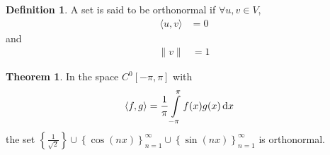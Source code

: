 \documentclass[fleqn, a4paper, 12pt, twoside]{article}
\theoremstyle{definition}
\newtheorem{definition}{Definition}
\theoremstyle{theorem}
\newtheorem{theorem}{Theorem}
\begin{document}
\begin{definition}
	A set is said to be orthonormal if $\forall u,v \in V$,
	\begin{align*}
		\langle u,v \rangle & = 0
	\end{align*}
	and
	\begin{align*}
		\|v\| & = 1
	\end{align*}
\end{definition}

\begin{theorem}
	In the space $C^0[-\pi,\pi]$ with
	\begin{align*}
		\langle f,g \rangle & = \frac{1}{\pi} \int\limits_{-\pi}^{\pi} f(x) g(x) \dif x
	\end{align*}
	the set $\left\{ \frac{1}{\sqrt{2}} \right\} \cup \left\{ \cos(n x) \right\}_{n = 1}^{\infty} \cup \left\{ \sin(n x) \right\}_{n = 1}^{\infty}$ is orthonormal.
\end{theorem}
\end{document}
